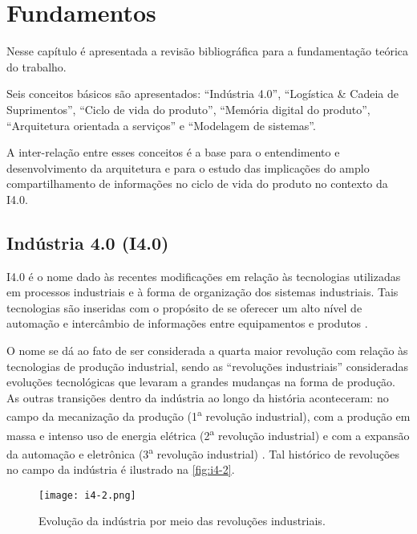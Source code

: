 \chapter{Fundamentos}
\label{cha:fundamentos}

Nesse capítulo é apresentada a revisão bibliográfica para a fundamentação teórica do trabalho.

Seis conceitos básicos são apresentados: ``Indústria 4.0'', ``Logística \& Cadeia de Suprimentos'', ``Ciclo de vida do produto'', ``Memória digital do produto'', ``Arquitetura orientada a serviços'' e ``Modelagem de sistemas''.

A inter-relação entre esses conceitos é a base para o entendimento e desenvolvimento da arquitetura e para o estudo das implicações do amplo compartilhamento de informações no ciclo de vida do produto no contexto da I4.0.

\section{Indústria 4.0 (I4.0)}
\label{sec:industria4}

I4.0 é o nome dado às recentes modificações em relação às tecnologias utilizadas em processos industriais e à forma de organização dos sistemas industriais. Tais tecnologias são inseridas com o propósito de se oferecer um alto nível de automação e intercâmbio de informações entre equipamentos e produtos \cite{lasi2014industryfour}.

O nome se dá ao fato de ser considerada a quarta maior revolução com relação às tecnologias de produção industrial, sendo as ``revoluções industriais'' consideradas evoluções tecnológicas que levaram a grandes mudanças na forma de produção. As outras transições dentro da indústria ao longo da história aconteceram: no campo da mecanização da produção (1\textsuperscript{a} revolução industrial), com a produção em massa e intenso uso de energia elétrica (2\textsuperscript{a} revolução industrial) e com a expansão da automação e eletrônica (3\textsuperscript{a} revolução industrial) \cite{lasi2014industryfour}. Tal histórico de revoluções no campo da indústria é ilustrado na \autoref{fig:i4-2}.

\begin{figure}[t]
	\centering
	\texttt{[image: i4-2.png]}
	\caption{Evolução da indústria por meio das revoluções industriais.}
	\label{fig:i4-2}
\end{figure}

